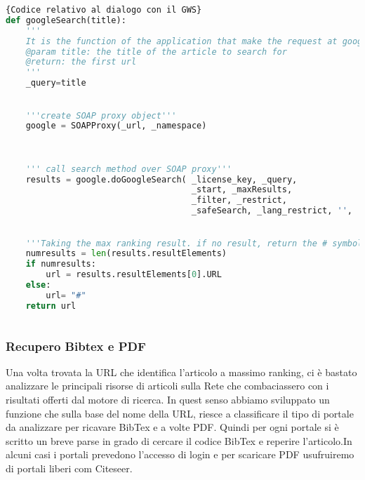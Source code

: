 \begin{lstlisting}[language=Python,frame=r,caption=Codice relativo al dialogo con il GWS ,breaklines=true,basicstyle=\scriptsize]{Codice relativo al dialogo con il GWS}
def googleSearch(title):
    '''
    It is the function of the application that make the request at google WS using SoapPY getting the first url of response.    
    @param title: the title of the article to search for
    @return: the first url
    '''
    _query=title

    
    '''create SOAP proxy object'''
    google = SOAPProxy(_url, _namespace)
    

    
    ''' call search method over SOAP proxy'''
    results = google.doGoogleSearch( _license_key, _query, 
                                     _start, _maxResults, 
                                     _filter, _restrict,
                                     _safeSearch, _lang_restrict, '', '' )

    
    '''Taking the max ranking result. if no result, return the # symbol'''                                                       
    numresults = len(results.resultElements)
    if numresults:
        url = results.resultElements[0].URL
    else:
        url= "#"
    return url
    
\end{lstlisting}


\subsubsection{Recupero Bibtex e PDF}

Una volta trovata la URL che identifica l'articolo a massimo ranking, ci è bastato analizzare le principali risorse di articoli sulla Rete che combaciassero con i risultati offerti dal motore di ricerca. In quest senso abbiamo sviluppato un funzione che sulla base del nome della URL, riesce a classificare il tipo di portale da analizzare per ricavare BibTex e a volte PDF. Quindi per ogni portale si è scritto un breve parse in grado di cercare il codice BibTex e reperire l'articolo.In alcuni casi i portali prevedono l'accesso di login e per scaricare PDF usufruiremo di portali liberi com Citeseer.



